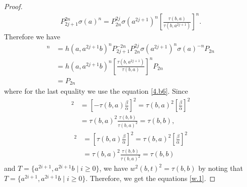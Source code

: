 \documentclass[a4paper,11pt]{amsart}
\numberwithin{equation}{section}
\begin{document}
\begin{proof}
\begin{align}
P_{2j+1}^{2n}\sigma(a)^n=P_{2n}^{2j}\sigma(a^{2j+1})^n
[\frac{\tau(b,a)}{\tau(b,a^{2j+1})}]^n.
\end{align}
Therefore we have
\begin{align*}
[w^4(a,a^{2j+1}) w^4(a,a^{2j+1}b) \sigma(a^{2j+1})]^n&=h(a,a^{2j+1}b)^n P_{2j+1}^{-2n} P_{2n}^{2j} \sigma(a^{2j+1})^n \sigma(a)^{-n} P_{2n}\\
&=h(a,a^{2j+1}b)^n [\frac{\tau(b,a^{2j+1})}{\tau(b,a)}]^n P_{2n}\\
&=P_{2n}
\end{align*}
where for the last equality we use the equation \eqref{4.b6}. Since
\begin{align*}
[w^2(b,a^{2j+1})]^2&=[-\tau(b,a)\frac{\beta}{\alpha}]^2=\tau(b,a)^2 [\frac{\beta}{\alpha}]^2\\
&=\tau(b,a)^2 \frac{\tau(b,b)}{\tau(b,a)^2}=\tau(b,b),
\end{align*}
\begin{align*}
[w^2(b,a^{2j+1}b)]^2&=[\tau(b,a)\frac{\beta}{\alpha}]^2=\tau(b,a)^2 [\frac{\beta}{\alpha}]^2\\
&=\tau(b,a)^2 \frac{\tau(b,b)}{\tau(b,a)^2}=\tau(b,b)
\end{align*}
and $T=\{a^{2i+1},a^{2i+1}b\;|\;i\geq 0\}$, we have $w^2(b,t)^2=\tau(b,b)$ by noting that $T=\{a^{2i+1},a^{2i+1}b\;|\;i\geq 0\}$. Therefore, we get the equations \eqref{w.1}.


\end{proof}
\end{document}
